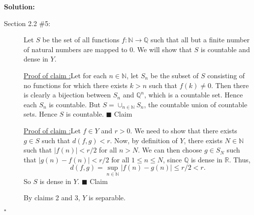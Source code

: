 \documentclass[12pt]{article}
\newcounter{ProofCounter}
\newcounter{ClaimCounter}[ProofCounter]
\newenvironment{Solution}{\stepcounter{ProofCounter}\textbf{Solution:}}{\hfill$\square$}
\newenvironment{claim}[1]{\vspace{1mm}\stepcounter{ClaimCounter}\par\noindent\underline{\bf Claim \theClaimCounter:}\space#1}{}
\newenvironment{claimproof}[1]{\par\noindent\underline{Proof of claim \theClaimCounter:}\space#1}{\hfill $\blacksquare$ Claim \theClaimCounter}
\begin{document}
\begin{Solution}
\begin{description}
    \item[Section 2.2 \#5:] Let $S$ be the set of all functions $f : \mathbb{N} \rightarrow \mathbb{Q}$ such that all but a finite number of natural
      numbers are mapped to 0. We will show that $S$ is countable and dense in $Y$.

      \begin{claimproof}
        Let for each $n \in \mathbb{N}$, let $S_n$ be the subset of $S$ consisting of no functions for which there exists $k > n$ such that $f(k) \neq
        0$. Then there is clearly a bijection between $S_n$ and $\mathbb{Q}^{n}$, which is a countable set. Hence each $S_n$ is countable.
        But $S = \cup_{n\in\mathbb{N}}S_n$, the countable union of countable sets. Hence $S$ is countable.
      \end{claimproof}

      \begin{claimproof}
        Let $f \in Y$ and $r > 0$. We need to show that there exists $g \in S$ such that $d(f,g) < r$. Now, by definition of $Y$, there exists $N \in
        \mathbb{N}$ such that $|f(n)| < r/2$ for all $n > N$. We can then choose $g \in S_N$ such that $|g(n) - f(n)| < r/2$ for all $1 \leq n \leq
        N$, since $\mathbb{Q}$ is dense in $\mathbb{R}$. Thus,
        \[
          d(f,g) = \sup_{n\in\mathbb{N}}|f(n) - g(n)| \leq r / 2 < r.
        \]
        So $S$ is dense in $Y$.
      \end{claimproof}


      By claims 2 and 3, $Y$ is separable.
  \end{description}
\end{Solution}
\end{document}
